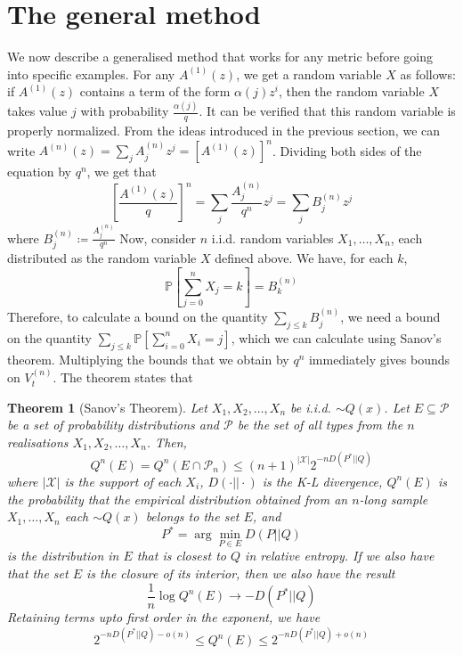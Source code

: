 \documentclass[conference,letterpaper]{IEEEtran}
\newtheorem{theorem}{Theorem}
\begin{document}
\section{The general method}\label{general method}
We now describe a generalised method that works for any metric before going into specific examples. For any $A^{(1)}(z)$, we get a random variable $X$ as follows: if $A^{(1)}(z)$ contains a term of the form $\alpha(j)z^i$, then the random variable $X$ takes value $j$ with probability $\frac{\alpha(j)}{q}$. It can be verified that this random variable is properly normalized. From the ideas introduced in the previous section, we can write $A^{(n)}(z) = \sum_{j} A_j^{(n)} z^j = [A^{(1)}(z)]^n$. Dividing both sides of the equation by $q^n$, we get that \begin{equation}
 \left[\frac{A^{(1)}(z)}{q}\right]^n = \sum_{j} \frac{A_j^{(n)}}{q^n} z^j = \sum_{j} B_j^{(n)} z^j
\end{equation}
where $B_j^{(n)} \coloneqq \frac{A_j^{(n)}}{q^n}$
Now, consider $n$ i.i.d. random variables $X_1, \ldots, X_n$, each distributed as the random variable $X$ defined above. We have, for each $k$, 
\begin{equation}
    \mathbb{P}\left[\sum_{j = 0}^{n} X_j = k \right] = B_k^{(n)}
\end{equation}
Therefore, to calculate a bound on the quantity $\sum_{j \leq k} B_j^{(n)}$, we need a bound on the quantity $\sum_{j \leq k} \mathbb{P}\left[\sum_{i = 0}^{n} X_i = j \right]$, which we can calculate using Sanov's theorem. Multiplying the bounds that we obtain by $q^n$ immediately gives bounds on $V_t^{(n)}$. The theorem states that \cite{Cover:2006:EIT:1146355}

\begin{theorem}[Sanov's Theorem]
Let $X_1, X_2, \ldots, X_n$ be i.i.d. $\sim Q(x)$. Let $E \subseteq \mathcal{P}$ be a set of probability distributions and $\mathcal{P}$ be the set of all types from the $n$ realisations $X_1, X_2, \ldots, X_n$. Then,
\begin{equation}
    Q^n(E) = Q^n(E \cap \mathcal{P}_n) \leq (n+1)^{\lvert \mathcal{X} \rvert} 2^{-nD(P^* || Q)}
\end{equation}
where $\lvert \mathcal{X} \rvert$ is the support of each $X_i$, $D(\cdot || \cdot)$ is the K-L divergence, $Q^n(E)$ is the probability that the empirical distribution obtained from an $n$-long sample $X_1, \ldots, X_n$ each $\sim Q(x)$ belongs to the set $E$, and
\begin{equation}
P^* = \arg \min_{P \in E} D(P || Q)    
\end{equation}
is the distribution in $E$ that is closest to $Q$ in relative entropy. 
If we also have that the set $E$ is the closure of its interior, then we also have the result
\begin{equation}
    \frac{1}{n} \log Q^n(E) \rightarrow -D(P^* || Q)
\end{equation}
Retaining terms upto first order in the exponent, we have
\begin{equation}
    2^{-nD(P^* || Q) - o(n)} \leq Q^n(E) \leq 2^{-nD(P^* || Q) + o(n)}
\end{equation}
\end{theorem}
\end{document}
